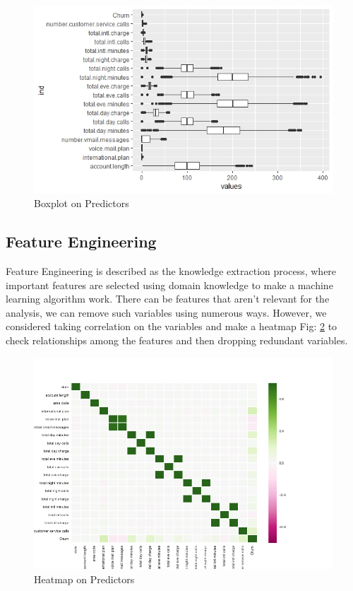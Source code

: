 \documentclass[a4paper,12pt]{report}
\begin{document}
\begin{figure}[htp]
\vspace{-70pt}
\center
\includegraphics[width=\textwidth]{Boxplot.jpeg}
\caption{Boxplot on Predictors}
\label{fig:2.1}
\end{figure}
\FloatBarrier

\subsection{Feature Engineering}

Feature Engineering is described as the knowledge extraction process, where important features are selected using domain knowledge to make a machine learning algorithm work. There can be features that aren't relevant for the analysis, we can remove such variables using numerous ways. However, we considered taking correlation on the variables and make a heatmap Fig: \ref{fig:2.2} to check relationships among the features and then dropping redundant variables. 
\begin{figure}[h]
\vspace{-20pt}
\centering
\includegraphics[scale = 0.4]{heatmap.png}
\caption{Heatmap on Predictors}
\label{fig:2.2}
\end{figure}
\FloatBarrier
\end{document}
